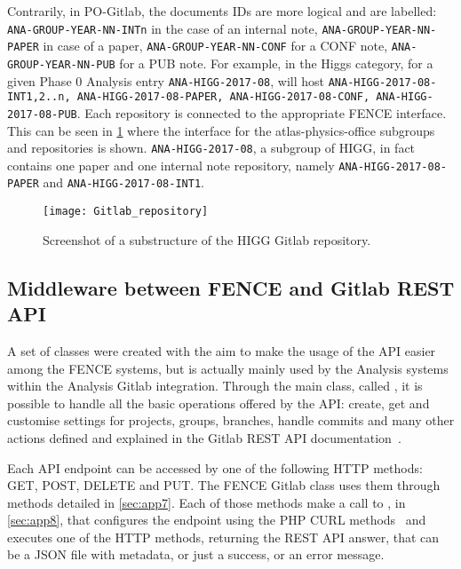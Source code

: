 Contrarily, in PO-Gitlab, the documents IDs are more logical and are labelled: \texttt{ANA-GROUP-YEAR-NN-INTn} in the case of an internal note,
\texttt{ANA-GROUP-YEAR-NN-PAPER} in case of a paper,
\texttt{ANA-GROUP-YEAR-NN-CONF} for a CONF note,
\texttt{ANA-GROUP-YEAR-NN-PUB} for a PUB note.
For example, in the Higgs category, for a given Phase 0 Analysis entry \texttt{ANA-HIGG-2017-08},
\pogitlab will host \texttt{ANA-HIGG-2017-08-INT1,2..n, ANA-HIGG-2017-08-PAPER, ANA-HIGG-2017-08-CONF, ANA-HIGG-2017-08-PUB}.
Each repository is connected to the appropriate FENCE interface.
This can be seen in \cref{fig:Gitlab_repository} where the \gitlab interface for the atlas-physics-office subgroups and repositories is shown.
\texttt{ANA-HIGG-2017-08}, a subgroup of HIGG, in fact contains one paper and one internal note repository, namely \texttt{ANA-HIGG-2017-08-PAPER} and \texttt{ANA-HIGG-2017-08-INT1}.

\begin{figure}[htb]
  \centering
  \texttt{[image: Gitlab\_repository]}
  \caption{Screenshot of a substructure of the HIGG Gitlab repository.}%
  \label{fig:Gitlab_repository}
\end{figure}

\subsection{Middleware between FENCE and Gitlab REST API}%
\label{sec:Middleware_between_FENCE_and_Gitlab_REST_API}

A set of classes were created with the aim to make the usage of the \gitlab API easier among the FENCE systems, but is actually mainly used by the Analysis systems within the Analysis Gitlab integration.
Through the main class, called , it is possible to handle all the basic operations offered by the API\@: create, get and customise settings for projects, groups, branches, handle commits and many other actions defined and explained in the Gitlab REST API documentation~\cite{rest_api}.

Each API endpoint can be accessed by one of the following HTTP methods: GET, POST, DELETE and PUT\@.
The FENCE Gitlab class uses them through methods detailed in \cref{sec:app7}.
Each of those methods make a call to , in \cref{sec:app8}, that configures the endpoint using the PHP CURL methods~\cite{php_curl} and executes one of the HTTP methods, returning the REST API answer, that can be a JSON file with metadata, or just a success, or an error message.

